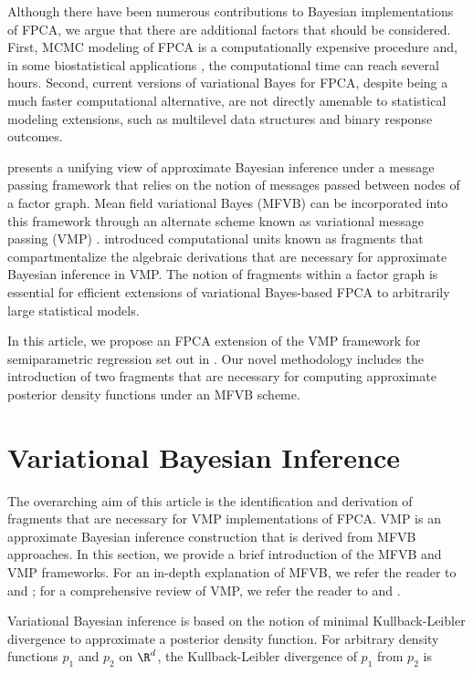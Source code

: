\documentclass[12pt]{article}
\theoremstyle{plain}
\theoremstyle{definition}
\theoremstyle{remark}
\begin{document}
Although there have been numerous contributions to Bayesian implementations of FPCA, we argue that there are
additional factors that should be considered. First, MCMC modeling of FPCA is a computationally expensive
procedure and, in some biostatistical applications \cite{goldsmith15}, the computational time can reach several
hours. Second, current versions of variational Bayes for FPCA, despite being a much faster computational alternative,
are not directly amenable to statistical modeling extensions, such as multilevel data structures and binary response
outcomes.

 presents a unifying view of approximate Bayesian inference under a message passing framework
that relies on the notion of messages passed between nodes of a factor graph. Mean field variational Bayes (MFVB)
can be incorporated into this framework through an alternate scheme known as variational message passing (VMP)
\cite{winn05}.  introduced computational units known as fragments that compartmentalize
the algebraic derivations that are necessary for approximate Bayesian inference in VMP. The notion of fragments
within a factor graph is essential for efficient extensions of variational Bayes-based FPCA to arbitrarily large statistical
models.

In this article, we propose an FPCA extension of the VMP framework for semiparametric regression set out in
. Our novel methodology includes the introduction of two fragments  that are necessary for
computing approximate posterior density functions under an MFVB scheme.


\section{Variational Bayesian Inference}
\label{sec:vbi}

The overarching aim of this article is the identification and derivation of fragments that are necessary for VMP
implementations of FPCA. VMP is an approximate Bayesian inference construction that is derived from MFVB
approaches. In this section, we provide a brief introduction of the MFVB and VMP frameworks. For an in-depth
explanation of MFVB, we refer the reader to  and ; for a comprehensive review
of VMP, we refer the reader to  and .

Variational Bayesian inference is based on the notion of minimal Kullback-Leibler divergence to approximate a
posterior density function. For arbitrary density functions $p_1$
and $p_2$ on $\R^d$, the Kullback-Leibler divergence of $p_1$ from $p_2$ is
\end{document}
